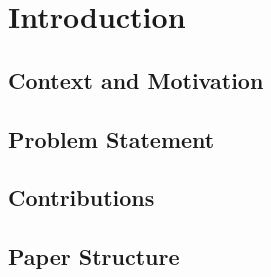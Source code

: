\section{Introduction}
\label{sec:introduction}

\subsection{Context and Motivation}

\subsection{Problem Statement}

\subsection{Contributions}

\subsection{Paper Structure}
